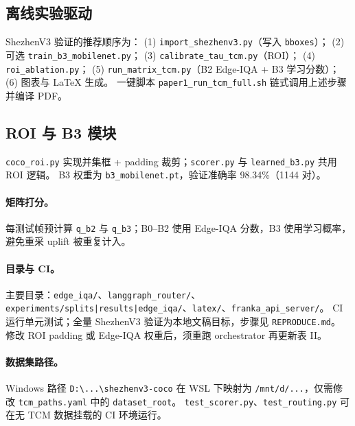 \begin{table}[t]
\centering
\caption{环境变量（\texttt{franka\_api\_server}）。}
\label{tab:env-vars-zh}
\small
{}
\end{table}

\subsection{离线实验驱动}
ShezhenV3 验证的推荐顺序为：
(1) \texttt{import\_shezhenv3.py}（写入 \texttt{bboxes}）；
(2) 可选 \texttt{train\_b3\_mobilenet.py}；
(3) \texttt{calibrate\_tau\_tcm.py}（ROI）；
(4) \texttt{roi\_ablation.py}；
(5) \texttt{run\_matrix\_tcm.py}（B2 Edge-IQA + B3 学习分数）；
(6) 图表与 \LaTeX{} 生成。
一键脚本 \texttt{paper1\_run\_tcm\_full.sh} 链式调用上述步骤并编译 PDF。

\subsection{ROI 与 B3 模块}
\texttt{coco\_roi.py} 实现并集框 + padding 裁剪；\texttt{scorer.py} 与 \texttt{learned\_b3.py} 共用 ROI 逻辑。
B3 权重为 \texttt{b3\_mobilenet.pt}，验证准确率 98.34\%（1144 对）。

\paragraph{矩阵打分。}
每测试帧预计算 \texttt{q\_b2} 与 \texttt{q\_b3}；B0--B2 使用 Edge-IQA 分数，B3 使用学习概率，避免重采 uplift 被重复计入。

\paragraph{目录与 CI。}
主要目录：\texttt{edge\_iqa/}、\texttt{langgraph\_router/}、\texttt{experiments/splits|results|edge\_iqa/}、\texttt{latex/}、\texttt{franka\_api\_server/}。
CI 运行单元测试；全量 ShezhenV3 验证为本地文稿目标，步骤见 \texttt{REPRODUCE.md}。
修改 ROI padding 或 Edge-IQA 权重后，须重跑 orchestrator 再更新表 II。

\paragraph{数据集路径。}
Windows 路径 \texttt{D:\textbackslash ...\textbackslash shezhenv3-coco} 在 WSL 下映射为 \texttt{/mnt/d/...}，仅需修改 \texttt{tcm\_paths.yaml} 中的 \texttt{dataset\_root}。
\texttt{test\_scorer.py}、\texttt{test\_routing.py} 可在无 TCM 数据挂载的 CI 环境运行。
